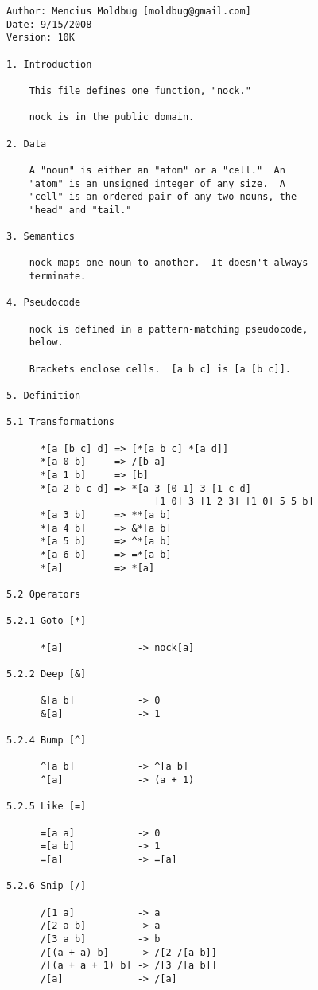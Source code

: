 \documentclass[twoside]{article}
\begin{document}
\begin{lstlisting}[label=lst:nock10k,caption={Nock 10K, 15 September 2008.},style=listingcode]
Author: Mencius Moldbug [moldbug@gmail.com]
Date: 9/15/2008
Version: 10K

1. Introduction

    This file defines one function, "nock."

    nock is in the public domain.

2. Data

    A "noun" is either an "atom" or a "cell."  An
    "atom" is an unsigned integer of any size.  A
    "cell" is an ordered pair of any two nouns, the
    "head" and "tail."

3. Semantics

    nock maps one noun to another.  It doesn't always
    terminate.

4. Pseudocode

    nock is defined in a pattern-matching pseudocode,
    below.

    Brackets enclose cells.  [a b c] is [a [b c]].

5. Definition

5.1 Transformations

      *[a [b c] d] => [*[a b c] *[a d]]
      *[a 0 b]     => /[b a]
      *[a 1 b]     => [b]
      *[a 2 b c d] => *[a 3 [0 1] 3 [1 c d]
                          [1 0] 3 [1 2 3] [1 0] 5 5 b]
      *[a 3 b]     => **[a b]
      *[a 4 b]     => &*[a b]
      *[a 5 b]     => ^*[a b]
      *[a 6 b]     => =*[a b]
      *[a]         => *[a]

5.2 Operators

5.2.1 Goto [*]

      *[a]             -> nock[a]

5.2.2 Deep [&]

      &[a b]           -> 0
      &[a]             -> 1

5.2.4 Bump [^]

      ^[a b]           -> ^[a b]
      ^[a]             -> (a + 1)

5.2.5 Like [=]

      =[a a]           -> 0
      =[a b]           -> 1
      =[a]             -> =[a]

5.2.6 Snip [/]

      /[1 a]           -> a
      /[2 a b]         -> a
      /[3 a b]         -> b
      /[(a + a) b]     -> /[2 /[a b]]
      /[(a + a + 1) b] -> /[3 /[a b]]
      /[a]             -> /[a]
\end{lstlisting}
\end{document}
